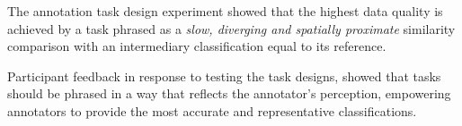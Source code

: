 \documentclass[../report.tex]{subfiles}
\begin{document}
The annotation task design experiment showed that the highest data quality is achieved by a task phrased as a \textit{slow, diverging and spatially proximate} similarity comparison with an intermediary classification equal to its reference.

Participant feedback in response to testing the task designs, showed that tasks should be phrased in a way that reflects the annotator's perception, empowering annotators to provide the most accurate and representative classifications.
\end{document}
